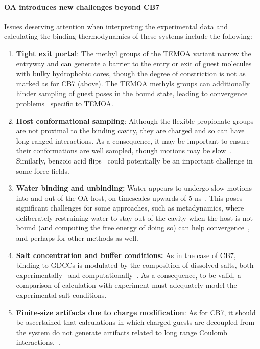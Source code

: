 \documentclass[aps,pre,twocolumn,nofootinbib,superscriptaddress,10pt, final,tightenlines]{revtex4-1}
\begin{document}
\paragraph{OA introduces new challenges beyond CB7} Issues deserving attention when interpreting the experimental data and calculating the binding thermodynamics of these systems include the following:

\begin{enumerate}
\item{{\bf Tight exit portal}: The methyl groups of the TEMOA variant narrow the entryway and can generate a barrier to the entry or exit of guest molecules with bulky hydrophobic cores, though the degree of constriction is not as marked as for CB7 (above). 
The TEMOA methyls groups can additionally hinder sampling of guest poses in the bound state, leading to convergence problems~\cite{yin_overview_2016} specific to TEMOA. }

\item{{\bf Host conformational sampling}: Although the flexible propionate groups are not proximal to the binding cavity, they are charged and so can have long-ranged interactions. 
As a consequence, it may be important to ensure their conformations are well sampled, though motions may be slow~\cite{mikulskis_free-energy_2014}. 
Similarly, benzoic acid flips~\cite{yin_sampl5_2016, tofoleanu_absolute_2016} could potentially be an important challenge in some force fields.}

\item{{\bf Water binding and unbinding:} Water appears to undergo slow motions into and out of the OA host, on timescales upwards of 5 ns~\cite{ewell_water_2008}. 
This poses significant challenges for some approaches, such as metadynamics, where deliberately restraining water to stay out of the cavity when the host is not bound (and computing the free energy of doing so) can help convergence~\cite{bhakat_resolving_2016}, and perhaps for other methods as well.}

\item{{\bf Salt concentration and buffer conditions:} As in the case of CB7, binding to GDCCs is modulated by the composition of dissolved salts, both experimentally~\cite{gibb_anion_2011, sokkalingam_binding_2016} and computationally~\cite{pal_combined_2016, tofoleanu_absolute_2016}. As a consequence, to be valid, a comparison of calculation with experiment must adequately model the experimental salt conditions.
}

\item{{\bf Finite-size artifacts due to charge modification}: As for CB7, it should be ascertained that calculations in which charged guests are decoupled from the system do not generate artifacts related to long range Coulomb interactions.~\cite{rocklin_calculating_2013, lin_overview_2014, reif_net_2014, simonson_concepts_2016}.}


\end{enumerate}
\end{document}
